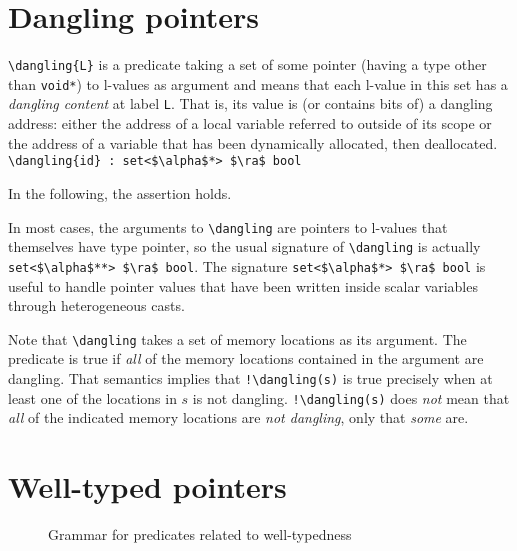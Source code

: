 \section{Dangling pointers}
\label{sec:dangling_pointers}
\lstinline|\dangling{L}|
is a predicate taking a set of some pointer
(having a type other than \lstinline|void*|) to l-values as
argument and means that each l-value in this set has a \emph{dangling
  content} at label \lstinline|L|. That is, its value is (or contains bits
of) a dangling address: either the address of a local
variable referred to outside of its scope or the address of a variable that
has been dynamically allocated, then deallocated.
\\ \makebox[5mm]{} \lstinline|\dangling{id} : set<$\alpha$*> $\ra$ bool|

\begin{example}
  In the following, the assertion holds.
\end{example}

In most cases, the arguments to \lstinline|\dangling| are pointers to
l-values that themselves have type pointer, so the usual signature
of \lstinline|\dangling| is actually
\lstinline|set<$\alpha$**> $\ra$ bool|.
The signature \lstinline|set<$\alpha$*> $\ra$ bool| is useful to handle
pointer values that have been written inside scalar variables through
heterogeneous casts.

Note that \lstinline|\dangling| takes a set of memory locations as its argument.
The predicate is true if \emph{all} of the memory locations contained in the argument are dangling. That
semantics implies that \lstinline|!\dangling(s)| is true precisely when at least one
of the locations in $s$ is not dangling. \lstinline|!\dangling(s)| does \emph{not} mean that 
\emph{all} of the indicated memory locations are \emph{not dangling}, only that \emph{some} are.

\section{Well-typed pointers}
\label{sec:welltyped}
\experimental
{}

\begin{figure}[h]
  \begin{cadre}
      
    \end{cadre}
  \caption{Grammar for predicates related to well-typedness }
\label{fig:gram:welltyped}
\end{figure}

